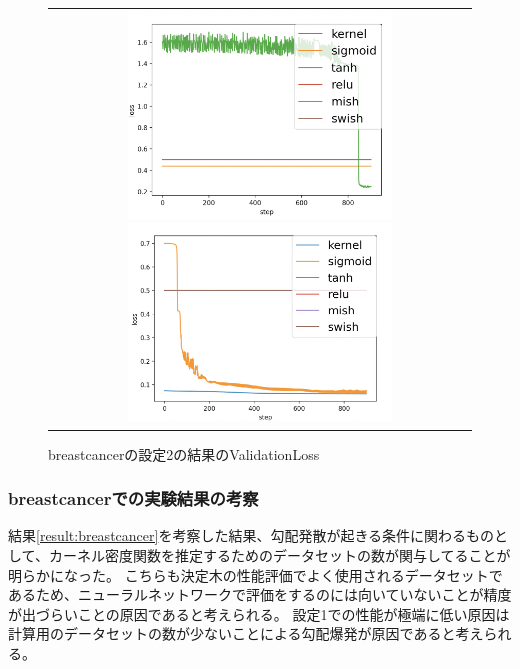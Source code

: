 \begin{figure}[hbtp]
    \begin{center}
        \begin{tabular}{c}
            \begin{minipage}{0.5\hsize}
                \includegraphics[clip, width=7cm]{asset/breastcancer_0.001_1000_3_005_sgd_non_kaiming_uniform}
                    \caption{breastcancerの設定1の結果のValidationLoss}
                    \label{breastcancer:loss_image1}
            \end{minipage}
            \hspace{10pt}
            \begin{minipage}{0.5\hsize}
                \includegraphics[clip, width=7cm]{asset/breastcancer_0.001_1000_3_05_sgd_non_kaiming_uniform}
                    \caption{breastcancerの設定2の結果のValidationLoss}
                    \label{breastcancer:loss_image2}
            \end{minipage}
        \end{tabular}
    \end{center}
\end{figure}


\subsubsection{breastcancerでの実験結果の考察}
結果\ref{result:breastcancer}を考察した結果、勾配発散が起きる条件に関わるものとして、カーネル密度関数を推定するためのデータセットの数が関与してることが明らかになった。
こちらも決定木の性能評価でよく使用されるデータセットであるため、ニューラルネットワークで評価をするのには向いていないことが精度が出づらいことの原因であると考えられる。
設定1での性能が極端に低い原因は計算用のデータセットの数が少ないことによる勾配爆発が原因であると考えられる。

